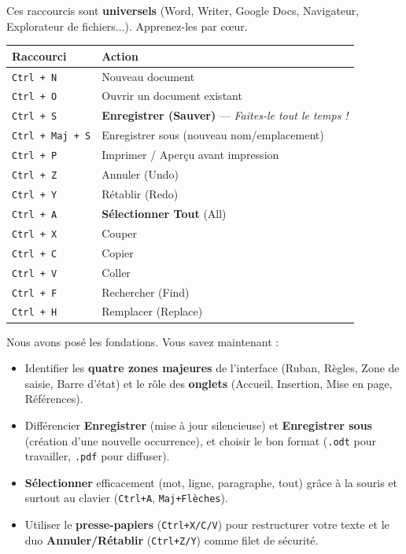 \documentclass[11pt]{article}
\newcounter{popsec}
\newcounter{popsub}
\newcommand{\courssub}[1]{%
  \stepcounter{popsub}%
  \par\vspace{9pt}\noindent{\popxbold\fontsize{11.5}{13}\selectfont\color{popink}{\color{poporange}\thepopsec.\thepopsub}\hspace{6pt}#1}\par\nopagebreak\vspace{4pt}
}
\begin{document}
\begin{aretenir}
Ces raccourcis sont \textbf{universels} (Word, Writer, Google Docs, Navigateur, Explorateur de fichiers...). Apprenez-les par cœur.
\begin{center}
\begin{tabularx}{\linewidth}{|l|X|}
\hline
\rowcolor{popblueL}
\textbf{Raccourci} & \textbf{Action} \\
\hline
\texttt{Ctrl + N} & Nouveau document \\
\texttt{Ctrl + O} & Ouvrir un document existant \\
\texttt{Ctrl + S} & \textbf{Enregistrer (Sauver)} — \emph{Faites-le tout le temps !} \\
\texttt{Ctrl + Maj + S} & Enregistrer sous (nouveau nom/emplacement) \\
\texttt{Ctrl + P} & Imprimer / Aperçu avant impression \\
\texttt{Ctrl + Z} & Annuler (Undo) \\
\texttt{Ctrl + Y} & Rétablir (Redo) \\
\texttt{Ctrl + A} & \textbf{Sélectionner Tout} (All) \\
\texttt{Ctrl + X} & Couper \\
\texttt{Ctrl + C} & Copier \\
\texttt{Ctrl + V} & Coller \\
\texttt{Ctrl + F} & Rechercher (Find) \\
\texttt{Ctrl + H} & Remplacer (Replace) \\
\hline
\end{tabularx}
\end{center}
\end{aretenir}

\courssub{Synthèse de la section}

Nous avons posé les fondations. Vous savez maintenant :
\begin{itemize}
    \item Identifier les \textbf{quatre zones majeures} de l'interface (Ruban, Règles, Zone de saisie, Barre d'état) et le rôle des \textbf{onglets} (Accueil, Insertion, Mise en page, Références).
    \item Différencier \textbf{Enregistrer} (mise à jour silencieuse) et \textbf{Enregistrer sous} (création d'une nouvelle occurrence), et choisir le bon format (\texttt{.odt} pour travailler, \texttt{.pdf} pour diffuser).
    \item \textbf{Sélectionner} efficacement (mot, ligne, paragraphe, tout) grâce à la souris et surtout au clavier (\texttt{Ctrl+A}, \texttt{Maj+Flèches}).
    \item Utiliser le \textbf{presse-papiers} (\texttt{Ctrl+X/C/V}) pour restructurer votre texte et le duo \textbf{Annuler/Rétablir} (\texttt{Ctrl+Z/Y}) comme filet de sécurité.
\end{itemize}
\end{document}
